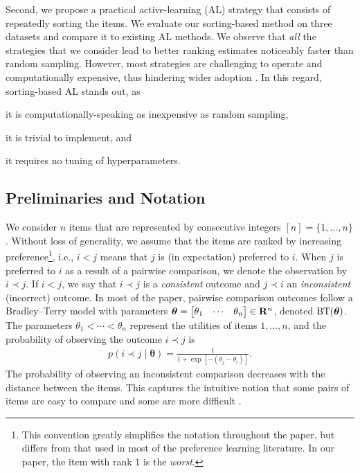 Second, we propose a practical active-learning (AL) strategy that consists of repeatedly sorting the items.
We evaluate our sorting-based method on three datasets and compare it to existing AL methods.
We observe that \emph{all} the strategies that we consider lead to better ranking estimates noticeably faster than random sampling.
However, most strategies are challenging to operate and computationally expensive, thus hindering wider adoption \citep{schein2007active}.
In this regard, sorting-based AL stands out, as
\begin{enuminline}
\item it is computationally-speaking as inexpensive as random sampling, 
\item it is trivial to implement, and
\item it requires no tuning of hyperparameters.
\end{enuminline}

\subsection{Preliminaries and Notation}

We consider $n$ items that are represented by consecutive integers $[n] = \{1, \ldots, n\}$.
Without loss of generality, we assume that the items are ranked by increasing preference\footnote{
This convention greatly simplifies the notation throughout the paper, but differs from that used in most of the preference learning literature.
In our paper, the item with rank $1$ is the \emph{worst}.}, i.e., $i < j$ means that $j$ is (in expectation) preferred to $i$.
When $j$ is preferred to $i$ as a result of a pairwise comparison, we denote the observation by $i \prec j$.
If $i < j$, we say that $i \prec j$ is a \emph{consistent} outcome and $j \prec i$ an \emph{inconsistent} (incorrect) outcome.
In most of the paper, pairwise comparison outcomes follow a Bradley--Terry model with parameters $\bm{\theta} = \begin{bmatrix} \theta_1 & \cdots & \theta_n \end{bmatrix} \in \mathbf{R}^n$, denoted $\operatorname{BT}(\bm{\theta})$.
The parameters $\theta_1 < \cdots < \theta_n$ represent the utilities of items $1, \ldots, n$, and the probability of observing the outcome $i \prec j$ is
\begin{align*}
p(i \prec j \mid \bm{\theta}) = \frac{1}{1 + \exp[-(\theta_j - \theta_i)]}.
\end{align*}
The probability of observing an inconsistent comparison decreases with the distance between the items.
This captures the intuitive notion that some pairs of items are easy to compare and some are more difficult \citep{zermelo1928berechnung, bradley1952rank}.

